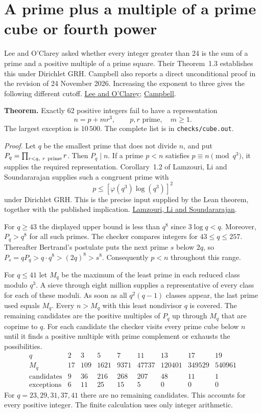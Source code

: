 \section{A prime plus a multiple of a prime cube or fourth power}
Lee and O'Clarey asked whether every integer greater than 24 is the sum of a prime and a positive multiple of a prime square. Their Theorem~1.3 establishes this under Dirichlet GRH. Campbell also reports a direct unconditional proof in the revision of 24 November 2026. Increasing the exponent to three gives the following different cutoff. \href{https://arxiv.org/html/2605.02426v1}{Lee and O'Clarey}; \href{https://arxiv.org/abs/2609.14714v2}{Campbell}.

\medskip\noindent\textbf{Theorem.} Exactly 62 positive integers fail to have a representation
\[
                  n=p+m r^3,\qquad p,r\text{ prime},\quad m\ge1.
\]
The largest exception is $10\,500$. The complete list is in \texttt{checks/cube.out}.

\smallskip\noindent\textit{Proof.}
Let $q$ be the smallest prime that does not divide $n$, and put $P_q=\prod_{r<q,\ r\ {\rm prime}}r$. Then $P_q\mid n$. If a prime $p<n$ satisfies $p\equiv n\pmod{q^3}$, it supplies the required representation. Corollary~1.2 of Lamzouri, Li and Soundararajan supplies such a congruent prime with
\[
                       p\le [\varphi(q^3)\log(q^3)]^2
\]
under Dirichlet GRH. This is the precise input supplied by the Lean theorem, together with the published implication. \href{https://arxiv.org/abs/1309.3595}{Lamzouri, Li and Soundararajan}.

For $q\ge43$ the displayed upper bound is less than $q^8$ since $3\log q<q$. Moreover, $P_q>q^8$ for all such primes. The checker compares integers for $43\le q\le257$. Thereafter Bertrand's postulate puts the next prime $s$ below $2q$, so $P_s=qP_q>q\cdot q^8>(2q)^8>s^8$. Consequently $p<n$ throughout this range.

For $q\le41$ let $M_q$ be the maximum of the least prime in each reduced class modulo $q^3$. A sieve through eight million supplies a representative of every class for each of these moduli. As soon as all $q^2(q-1)$ classes appear, the last prime used equals $M_q$. Every $n>M_q$ with this least nondivisor $q$ is covered. The remaining candidates are the positive multiples of $P_q$ up through $M_q$ that are coprime to $q$. For each candidate the checker visits every prime cube below $n$ until it finds a positive multiple with prime complement or exhausts the possibilities.
\[
\begin{array}{c|rrrrrrrr}
q&2&3&5&7&11&13&17&19\\ \hline
M_q&17&109&1621&9371&47737&120401&349529&540961\\
\text{candidates}&9&36&216&268&207&48&11&1\\
\text{exceptions}&6&11&25&15&5&0&0&0
\end{array}
\]
For $q=23,29,31,37,41$ there are no remaining candidates. This accounts for every positive integer. The finite calculation uses only integer arithmetic.

